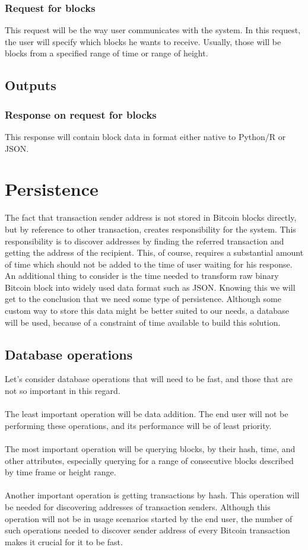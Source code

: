 \documentclass[12pt, en, eng, twoside, final]{mgr}
\begin{document}
\subsubsection{Request for blocks} This request will be the way user communicates with the system. In this request, the user will specify which blocks he wants to receive. Usually, those will be blocks from a specified range of time or range of height.

\subsection{Outputs}
\subsubsection{Response on request for blocks} This response will contain block data in format either native to Python/R or JSON.


\section{Persistence}
The fact that transaction sender address is not stored in Bitcoin blocks directly, but by reference to other transaction, creates responsibility for the system. This responsibility is to discover addresses by finding the referred transaction and getting the address of the recipient. This, of course, requires a substantial amount of time which should not be added to the time of user waiting for his response. 
\\
An additional thing to consider is the time needed to transform raw binary Bitcoin block into widely used data format such as JSON. Knowing this we will get to the conclusion that we need some type of persistence. Although some custom way to store this data might be better suited to our needs, a database will be used, because of a constraint of time available to build this solution.

\subsection{Database operations}
Let's consider database operations that will need to be fast, and those that are not so important in this regard.
\\
\\
The least important operation will be data addition. The end user will not be performing these operations, and its performance will be of least priority.
\\
\\
The most important operation will be querying blocks, by their hash, time, and other attributes, especially querying for a range of consecutive blocks described by time frame or height range.
\\
\\
Another important operation is getting transactions by hash. This operation will be needed for discovering addresses of transaction senders. Although this operation will not be in usage scenarios started by the end user, the number of such operations needed to discover sender address of every Bitcoin transaction makes it crucial for it to be fast.
\end{document}
